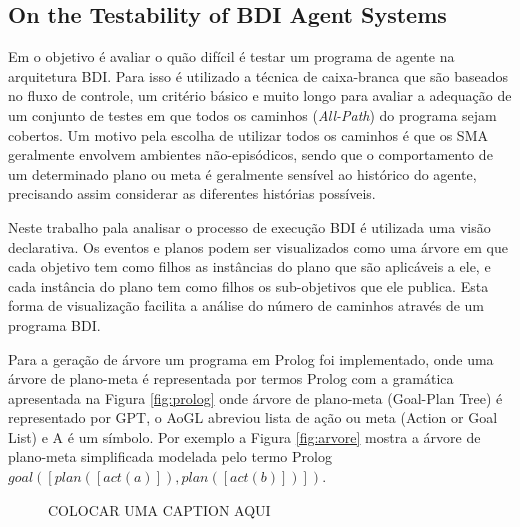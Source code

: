 \documentclass[dm,ppgcomp]{texfurg} %
\begin{document}
\subsection{On the Testability of BDI Agent Systems}

Em \cite{winikoff2014testability} o objetivo é avaliar o quão difícil é testar um programa de agente na arquitetura BDI. Para isso é utilizado a técnica de caixa-branca que são baseados no fluxo de controle, um critério básico e muito longo para avaliar a adequação de um conjunto de testes em que todos os caminhos (\textit{All-Path}) do programa sejam cobertos. Um motivo pela escolha de utilizar todos os caminhos é que os SMA geralmente envolvem ambientes não-episódicos, sendo que o comportamento de um determinado plano ou meta é geralmente sensível ao histórico do agente, precisando assim considerar as diferentes histórias possíveis.

Neste trabalho pala analisar o processo de execução BDI é utilizada uma visão declarativa. Os eventos e planos podem ser visualizados como uma árvore em que cada objetivo tem como filhos as instâncias do plano que são aplicáveis a ele, e cada instância do plano tem como filhos os sub-objetivos que ele publica. Esta forma de visualização facilita a análise do número de caminhos através de um programa BDI.

Para a geração de árvore um programa em Prolog foi implementado, onde uma árvore de plano-meta é representada por termos Prolog com a gramática apresentada na Figura \ref{fig:prolog} onde árvore de plano-meta (Goal-Plan Tree) é representado por GPT, o AoGL abreviou lista de ação ou meta (Action or Goal List) e A é um símbolo. Por exemplo a Figura \ref{fig:arvore} mostra a árvore de plano-meta simplificada modelada pelo termo Prolog \begin{math} goal\left ( \left [ plan\left ( \left [ act\left ( a \right ) \right ] \right ),plan\left ( \left [ act\left ( b \right ) \right ] \right ) \right ] \right )\end{math}.

\begin{figure}
  \centering
  \caption{COLOCAR UMA CAPTION AQUI}
  \label{fig:prolog,arvore}
\end{figure}
\end{document}
